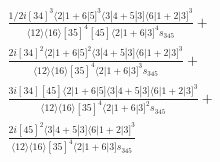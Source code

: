 \documentclass[varwidth, border=5pt]{standalone}
\begin{document}
\begin{my}
$\begin{gathered}
\scriptscriptstyle\frac{1/2i[34]^3⟨2|1+6|5]^3⟨3|4+5|3]⟨6|1+2|3]^3}{⟨12⟩⟨16⟩[35]^4[45]⟨2|1+6|3]^4s_{345}}+\\
\scriptscriptstyle\frac{2i[34]^2⟨2|1+6|5]^2⟨3|4+5|3]⟨6|1+2|3]^3}{⟨12⟩⟨16⟩[35]^4⟨2|1+6|3]^3s_{345}}+\\
\scriptscriptstyle\frac{3i[34][45]⟨2|1+6|5]⟨3|4+5|3]⟨6|1+2|3]^3}{⟨12⟩⟨16⟩[35]^4⟨2|1+6|3]^2s_{345}}+\\
\scriptscriptstyle\frac{2i[45]^2⟨3|4+5|3]⟨6|1+2|3]^3}{⟨12⟩⟨16⟩[35]^4⟨2|1+6|3]s_{345}}\phantom{+}
\end{gathered}$
\end{my}
\end{document}
